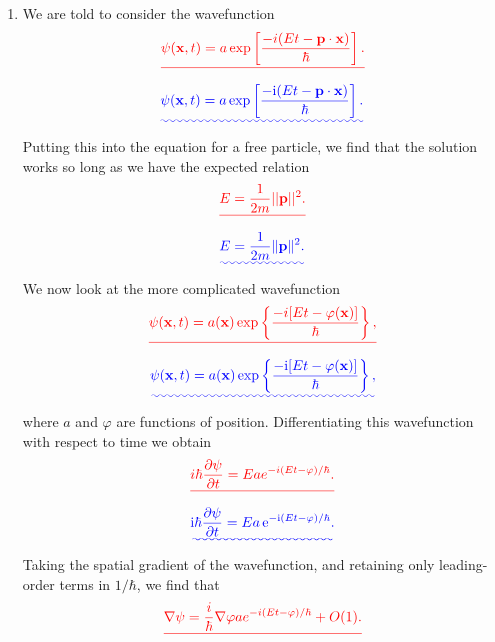 \documentclass[a4paper,10pt]{paper}
\providecommand{\DIFadd}[1]{{\protect\color{blue}\uwave{#1}}} %
\providecommand{\DIFdel}[1]{{\protect\color{red}\sout{#1}}}                      %
\providecommand{\DIFaddbegin}{} %
\providecommand{\DIFaddend}{} %
\providecommand{\DIFdelbegin}{} %
\providecommand{\DIFdelend}{} %
\begin{document}
\begin{enumerate}
\item We are told to consider the wavefunction
\DIFdelbegin \begin{displaymath}
    \DIFdel{\psi(\mathbf{x},t)=a\exp\left[\frac{-i(E t-\mathbf{p}\cdot\mathbf{x})}{\hbar}\right].
}\end{displaymath}%
\DIFdelend \DIFaddbegin \begin{equation*}
    \DIFadd{\psi(\mathbf{x},t)=a\exp\left[\frac{-\ii(E t-\mathbf{p}\cdot\mathbf{x})}{\hbar}\right].
}\end{equation*}\DIFaddend 
Putting this into the equation for a free particle, we find that the solution works so long as we have the expected relation
\DIFdelbegin \begin{displaymath}
    \DIFdel{E=\frac{1}{2m}||\mathbf{p}||^{2}.
}\end{displaymath}%
\DIFdelend \DIFaddbegin \begin{equation*}
    \DIFadd{E=\frac{1}{2m}\|\mathbf{p}\|^{2}.
}\end{equation*}\DIFaddend 
We now look at the more complicated wavefunction
\DIFdelbegin \begin{displaymath}
    \DIFdel{\psi(\mathbf{x},t)=a(\mathbf{x})\exp\left\{\frac{-i[E t-\varphi(\mathbf{x})]}{\hbar}\right\},
}\end{displaymath}%
\DIFdelend \DIFaddbegin \begin{equation*}
    \DIFadd{\psi(\mathbf{x},t)=a(\mathbf{x})\exp\left\{\frac{-\ii[E t-\varphi(\mathbf{x})]}{\hbar}\right\},
}\end{equation*}\DIFaddend 
where $a$ and $\varphi$ are functions of position. Differentiating this wavefunction with respect to time we obtain
\DIFdelbegin \begin{displaymath}
    \DIFdel{i\hbar\frac{\partial\psi}{\partial t}=E a e^{-i(Et-\varphi)/\hbar}.
}\end{displaymath}%
\DIFdelend \DIFaddbegin \begin{equation*}
    \DIFadd{\ii\hbar\frac{\partial\psi}{\partial t}=E a\,\ee^{-\ii(Et-\varphi)/\hbar}.
}\end{equation*}\DIFaddend 
Taking the spatial gradient of the wavefunction, and retaining only leading-order terms in $1/\hbar$, we find that
\DIFdelbegin \begin{displaymath}
    \DIFdel{\nabla\psi=\frac{i}{\hbar}\nabla\varphi a e^{-i(Et-\varphi)/\hbar}+O(1).
}\end{displaymath}%
\DIFdelend \DIFaddbegin \begin{equation*}

\end{equation*}
\end{enumerate}
\end{document}
